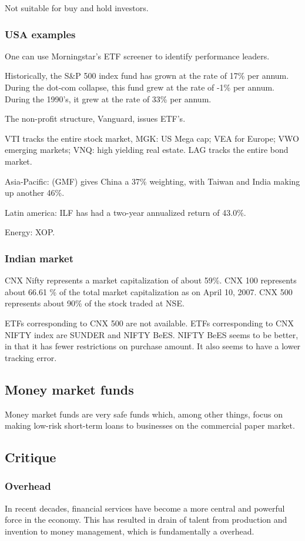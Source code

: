 \documentclass[oneside, article]{memoir}
\begin{document}
Not suitable for buy and hold investors.

\subsubsection{USA examples}
One can use Morningstar's ETF screener to identify performance leaders.

Historically, the S\&P 500 index fund has grown at the rate of 17\% per annum. During the dot-com collapse, this fund grew at the rate of -1\% per annum. During the 1990's, it grew at the rate of 33\% per annum. 

The non-profit structure, Vanguard, issues ETF's.

VTI tracks the entire stock market, MGK: US Mega cap; VEA for Europe; VWO emerging markets; VNQ: high yielding real estate. LAG tracks the entire bond market.

Asia-Pacific: (GMF) gives China a 37\% weighting, with Taiwan and India making up another 46\%.

Latin america: ILF has had a two-year annualized return of 43.0\%.

Energy: XOP.

\subsubsection{Indian market}
CNX Nifty represents a market capitalization of about 59\%. CNX 100 represents about 66.61 \% of the total market capitalization as on April 10, 2007. CNX 500 represents about 90\% of the stock traded at NSE.

ETFs corresponding to CNX 500 are not available. ETFs corresponding to CNX NIFTY index are SUNDER and NIFTY BeES. NIFTY BeES seems to be better, in that it has fewer restrictions on purchase amount. It also seems to have a lower tracking error.

\subsection{Money market funds}
Money market funds are very safe funds which, among other things, focus on making low-risk short-term loans to businesses on the commercial paper market.

\subsection{Critique}
\subsubsection{Overhead}
In recent decades, financial services have become a more central and powerful force in the economy. This has resulted in drain of talent from production and invention to money management, which is fundamentally a overhead.
\end{document}
